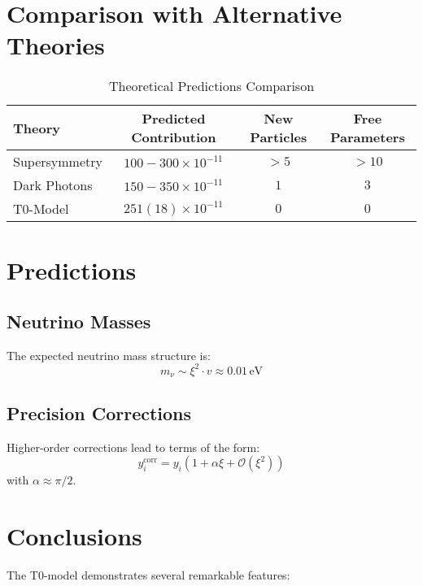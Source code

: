 \documentclass[12pt,a4paper]{article}
\newcommand{\xipar}{\xi}
\begin{document}
	\section{Comparison with Alternative Theories}
	
	\begin{table}[H]
		\centering
		\caption{Theoretical Predictions Comparison}
		\begin{tabular}{@{}lccc@{}}
			\toprule
			\textbf{Theory} & \textbf{Predicted Contribution} & \textbf{New Particles} & \textbf{Free Parameters} \\
			\midrule
			Supersymmetry & $100-300 \times 10^{-11}$ & $>5$ & $>10$ \\
			Dark Photons & $150-350 \times 10^{-11}$ & $1$ & $3$ \\
			T0-Model & $251(18) \times 10^{-11}$ & $0$ & $0$ \\
			\bottomrule
		\end{tabular}
	\end{table}
	
	\section{Predictions}
	
	\subsection{Neutrino Masses}
	
	The expected neutrino mass structure is:
	\begin{equation}
		m_\nu \sim \xipar^2 \cdot v \approx 0.01\,\text{eV}
	\end{equation}
	
	\subsection{Precision Corrections}
	
	Higher-order corrections lead to terms of the form:
	\begin{equation}
		y_i^{\text{corr}} = y_i\left(1 + \alpha \xipar + \mathcal{O}(\xipar^2)\right)
	\end{equation}
	with $\alpha \approx \pi/2$.
	
	\section{Conclusions}
	
	The T0-model demonstrates several remarkable features:
	
\end{document}
